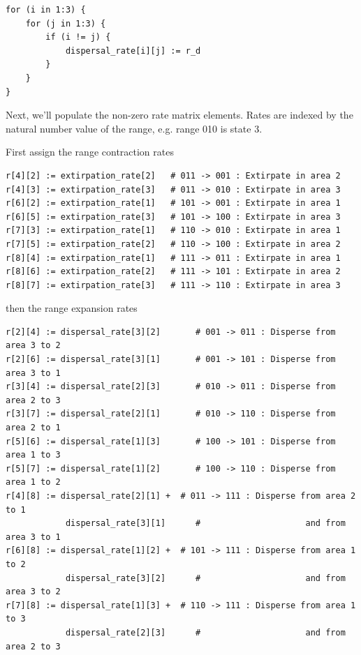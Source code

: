 \begin{snugshade}
\begin{lstlisting}
for (i in 1:3) {
    for (j in 1:3) {
        if (i != j) {
            dispersal_rate[i][j] := r_d
        }
    }
}
\end{lstlisting}
\end{snugshade}

Next, we'll populate the non-zero rate matrix elements.
Rates are indexed by the natural number value of the range, e.g. range 010 is state 3.

First assign the range contraction rates

\begin{snugshade}
\begin{lstlisting}
r[4][2] := extirpation_rate[2]   # 011 -> 001 : Extirpate in area 2
r[4][3] := extirpation_rate[3]   # 011 -> 010 : Extirpate in area 3
r[6][2] := extirpation_rate[1]   # 101 -> 001 : Extirpate in area 1
r[6][5] := extirpation_rate[3]   # 101 -> 100 : Extirpate in area 3
r[7][3] := extirpation_rate[1]   # 110 -> 010 : Extirpate in area 1
r[7][5] := extirpation_rate[2]   # 110 -> 100 : Extirpate in area 2
r[8][4] := extirpation_rate[1]   # 111 -> 011 : Extirpate in area 1
r[8][6] := extirpation_rate[2]   # 111 -> 101 : Extirpate in area 2
r[8][7] := extirpation_rate[3]   # 111 -> 110 : Extirpate in area 3
\end{lstlisting}
\end{snugshade}

then the range expansion rates

\begin{snugshade}
\begin{lstlisting}
r[2][4] := dispersal_rate[3][2]       # 001 -> 011 : Disperse from area 3 to 2
r[2][6] := dispersal_rate[3][1]       # 001 -> 101 : Disperse from area 3 to 1
r[3][4] := dispersal_rate[2][3]       # 010 -> 011 : Disperse from area 2 to 3
r[3][7] := dispersal_rate[2][1]       # 010 -> 110 : Disperse from area 2 to 1
r[5][6] := dispersal_rate[1][3]       # 100 -> 101 : Disperse from area 1 to 3
r[5][7] := dispersal_rate[1][2]       # 100 -> 110 : Disperse from area 1 to 2
r[4][8] := dispersal_rate[2][1] +  # 011 -> 111 : Disperse from area 2 to 1
            dispersal_rate[3][1]      #                     and from area 3 to 1
r[6][8] := dispersal_rate[1][2] +  # 101 -> 111 : Disperse from area 1 to 2
            dispersal_rate[3][2]      #                     and from area 3 to 2                        
r[7][8] := dispersal_rate[1][3] +  # 110 -> 111 : Disperse from area 1 to 3 
            dispersal_rate[2][3]      #                     and from area 2 to 3
\end{lstlisting}
\end{snugshade}

